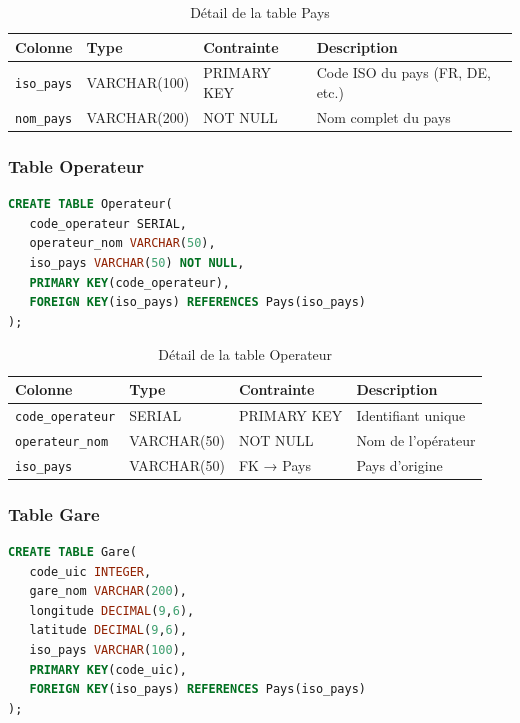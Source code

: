 \documentclass[12pt,a4paper]{article}
\begin{document}
\begin{table}[h!]
\centering
\begin{tabular}{|p{3.5cm}|p{2.5cm}|p{2.5cm}|p{4cm}|}
\hline
\textbf{Colonne} & \textbf{Type} & \textbf{Contrainte} & \textbf{Description} \\
\hline
\texttt{iso\_pays} & VARCHAR(100) & PRIMARY KEY & Code ISO du pays (FR, DE, etc.) \\
\hline
\texttt{nom\_pays} & VARCHAR(200) & NOT NULL & Nom complet du pays \\
\hline
\end{tabular}
\caption{Détail de la table Pays}
\end{table}

\subsubsection{Table Operateur}
\begin{lstlisting}[language=SQL, caption=Structure de la table Operateur]
CREATE TABLE Operateur(
   code_operateur SERIAL,
   operateur_nom VARCHAR(50),
   iso_pays VARCHAR(50) NOT NULL,
   PRIMARY KEY(code_operateur),
   FOREIGN KEY(iso_pays) REFERENCES Pays(iso_pays)
);
\end{lstlisting}

\begin{table}[h!]
\centering
\begin{tabular}{|p{3.5cm}|p{2.5cm}|p{2.5cm}|p{4cm}|}
\hline
\textbf{Colonne} & \textbf{Type} & \textbf{Contrainte} & \textbf{Description} \\
\hline
\texttt{code\_operateur} & SERIAL & PRIMARY KEY & Identifiant unique \\
\hline
\texttt{operateur\_nom} & VARCHAR(50) & NOT NULL & Nom de l'opérateur \\
\hline
\texttt{iso\_pays} & VARCHAR(50) & FK → Pays & Pays d'origine \\
\hline
\end{tabular}
\caption{Détail de la table Operateur}
\end{table}

\subsubsection{Table Gare}
\begin{lstlisting}[language=SQL, caption=Structure de la table Gare]
CREATE TABLE Gare(
   code_uic INTEGER,
   gare_nom VARCHAR(200),
   longitude DECIMAL(9,6),
   latitude DECIMAL(9,6),
   iso_pays VARCHAR(100),
   PRIMARY KEY(code_uic),
   FOREIGN KEY(iso_pays) REFERENCES Pays(iso_pays)
);
\end{lstlisting}
\end{document}

